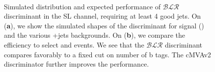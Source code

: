 \begin{figure}
\begin{centering}
\\
\caption{Simulated distribution and expected performance of $\mathcal{BLR}$ discriminant in the SL channel, requiring at least 4 good jets. On (\textbf{a}), we show the simulated shapes of the discriminant for signal (\ttHbb) and the various \ttbar+jets backgrounds. On (\textbf{b}), we compare the efficiency to select \ttHbb and \ttlf events. We see that the $\mathcal{BLR}$ discriminant compares favorably to a fixed cut on number of b tags. The cMVAv2 discriminator further improves the performance.}
\label{fig:blr_discrimination}
\end{centering}
\end{figure}


